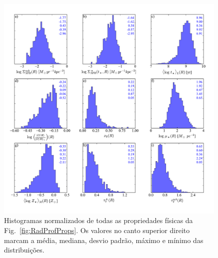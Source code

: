 \begin{figure}
	\centering
	\includegraphics[width=0.99\textwidth]{figuras/histo_props_R.pdf}
	\caption[Histogramas dos perfis radiais das propriedades físicas.]
	{Histogramas normalizados de todas as propriedades físicas da Fig.\ \ref{fig:RadProfProps}. Os
valores no canto superior direito marcam a média, mediana, desvio padrão, máximo e mínimo das
distribuições.}
	\label{fig:HistoRadProfProps}
\end{figure}

